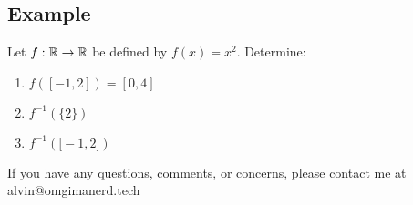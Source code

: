 \documentclass[letterpaper, 12pt]{math}
\begin{document}
\subsection*{Example}
Let \( f:\mathbb{R}\to\mathbb{R} \) be defined by \( f(x) = x^{2} \). Determine:
\begin{enumerate}
  \item \( f([-1,2]) = [0,4] \)
  \item \( f^{-1}(\{2\}) \)
  \item \( f^{-1}(\big[-1,2\big]) \)
\end{enumerate}

\begin{center}
  If you have any questions, comments, or concerns, please contact me at
  alvin@omgimanerd.tech
\end{center}
\end{document}

